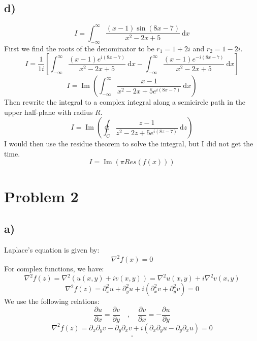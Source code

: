 \documentclass{article}
\begin{document}
\subsection*{d)}
\[
I = ∫_{-∞}^{∞} \frac{(x-1) \sin (8x - 7)}{x^2 - 2x + 5} \ \mathrm{d}x
\]
First we find the roots of the denominator to be $r_1 = 1 + 2i$ and $r_2 = 1 - 2i$. 
\[
I = \frac{1}{1i} \left[ ∫_{-∞}^{∞} \frac{(x-1)e^{i(8x-7)}}{x^2 - 2x + 5} \ \mathrm{d}x  - ∫_{-∞}^{∞} \frac{(x-1)e^{-i(8x - 7)}}{x^2 - 2x + 5} \ \mathrm{d}x\right]
\]
\[
I = \operatorname{Im} \left(∫_{-∞}^{∞} \frac{x-1}{x^2 - 2x + 5 e^{i(8x-7)}} \ \mathrm{d}x\right)
\]
Then rewrite the integral to a complex integral along a semicircle path in the upper half-plane with radius $R$.
\[
I = \operatorname{Im} \left(∮_{C} \frac{z-1}{z^2 - 2z + 5 e^{i(8z-7)}} \ \mathrm{d}z\right)
\]
I would then use the residue theorem to solve the integral, but I did not get the time. 
\[
I = \operatorname{Im} \left(π Res \left(f(x)\right)\right)
\]

\section*{Problem 2}
\subsection*{a)}
Laplace's equation is given by:
\[
∇^{2} f(x) = 0
\]
For complex functions, we have:
\[
∇^{2} f(z) = ∇^{2} (u(x, y) + iv(x, y)) = ∇^{2} u(x, y) + i∇^{2} v(x, y) 
\]
\[
∇^{2} f(z) = ∂_{x}^{2} u + ∂_{y}^{2} u + i(∂_{x}^{2} v + ∂_{y}^{2} v) = 0
\]
We use the following relations: 
\[
\frac{∂u}{∂x} = \frac{∂v}{∂y} \quad , \quad  \frac{∂v}{∂x} = -\frac{∂u}{∂y}
\]
\[
\underline{\underline{∇^{2} f(z) = ∂_x ∂_y v - ∂_y ∂_x v + i(∂_x ∂_y u - ∂_y ∂_x u) = 0}}
\]
\end{document}
